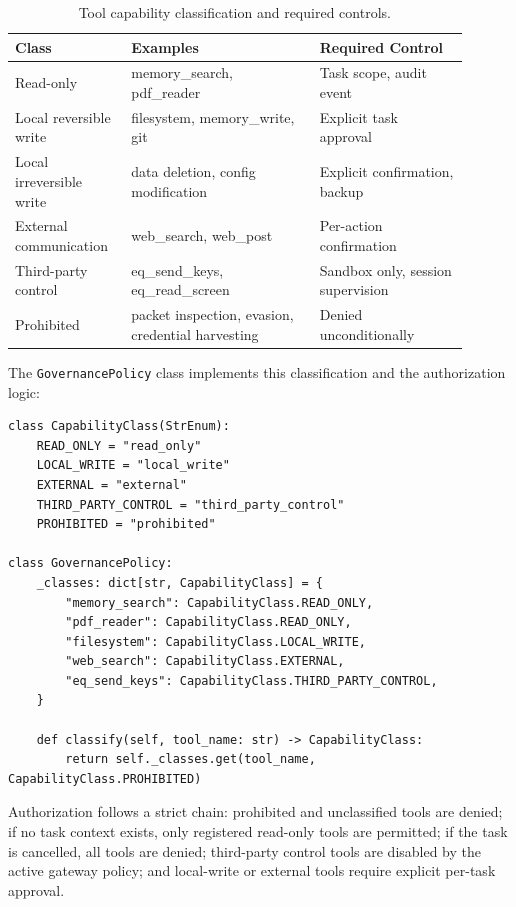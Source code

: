 \documentclass[11pt]{article}
\begin{document}
\begin{table}[ht]
\centering
\caption{Tool capability classification and required controls.}
\label{tab:classes}
\begin{tabular}{p{0.22\linewidth} p{0.38\linewidth} p{0.30\linewidth}}
\toprule
\textbf{Class} & \textbf{Examples} & \textbf{Required Control} \\
\midrule
Read-only & memory\_search, pdf\_reader & Task scope, audit event \\
Local reversible write & filesystem, memory\_write, git & Explicit task approval \\
Local irreversible write & data deletion, config modification & Explicit confirmation, backup \\
External communication & web\_search, web\_post & Per-action confirmation \\
Third-party control & eq\_send\_keys, eq\_read\_screen & Sandbox only, session supervision \\
Prohibited & packet inspection, evasion, credential harvesting & Denied unconditionally \\
\bottomrule
\end{tabular}
\end{table}

The \texttt{GovernancePolicy} class implements this classification and the authorization logic:

\begin{lstlisting}
class CapabilityClass(StrEnum):
    READ_ONLY = "read_only"
    LOCAL_WRITE = "local_write"
    EXTERNAL = "external"
    THIRD_PARTY_CONTROL = "third_party_control"
    PROHIBITED = "prohibited"

class GovernancePolicy:
    _classes: dict[str, CapabilityClass] = {
        "memory_search": CapabilityClass.READ_ONLY,
        "pdf_reader": CapabilityClass.READ_ONLY,
        "filesystem": CapabilityClass.LOCAL_WRITE,
        "web_search": CapabilityClass.EXTERNAL,
        "eq_send_keys": CapabilityClass.THIRD_PARTY_CONTROL,
    }

    def classify(self, tool_name: str) -> CapabilityClass:
        return self._classes.get(tool_name, CapabilityClass.PROHIBITED)
\end{lstlisting}

Authorization follows a strict chain: prohibited and unclassified tools are denied; if
no task context exists, only registered read-only tools are permitted; if the task is
cancelled, all tools are denied; third-party control tools are disabled by the active
gateway policy; and local-write or external tools require explicit per-task approval.
\end{document}
